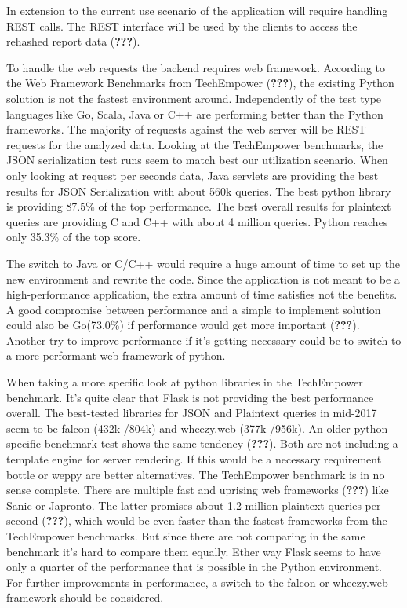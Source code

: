 \documentclass[american,a4paper,oneside,,tablecaptionabove]{scrbook}
\begin{document}
In extension to the current use scenario of the application will require
handling REST calls. The REST interface will be used by the clients to
access the rehashed report data ({\textbf{???}}).

To handle the web requests the backend requires web framework. According
to the Web Framework Benchmarks from TechEmpower ({\textbf{???}}), the
existing Python solution is not the fastest environment around.
Independently of the test type languages like Go, Scala, Java or C++ are
performing better than the Python frameworks. The majority of requests
against the web server will be REST requests for the analyzed data.
Looking at the TechEmpower benchmarks, the JSON serialization test runs
seem to match best our utilization scenario. When only looking at
request per seconds data, Java servlets are providing the best results
for JSON Serialization with about 560k queries. The best python library
is providing 87.5\% of the top performance. The best overall results for
plaintext queries are providing C and C++ with about 4 million queries.
Python reaches only 35.3\% of the top score.

The switch to Java or C/C++ would require a huge amount of time to set
up the new environment and rewrite the code. Since the application is
not meant to be a high-performance application, the extra amount of time
satisfies not the benefits. A good compromise between performance and a
simple to implement solution could also be Go(73.0\%) if performance
would get more important ({\textbf{???}}). Another try to improve
performance if it's getting necessary could be to switch to a more
performant web framework of python.

When taking a more specific look at python libraries in the TechEmpower
benchmark. It's quite clear that Flask is not providing the best
performance overall. The best-tested libraries for JSON and Plaintext
queries in mid-2017 seem to be falcon (432k /804k) and wheezy.web (377k
/956k). An older python specific benchmark test shows the same tendency
({\textbf{???}}). Both are not including a template engine for server
rendering. If this would be a necessary requirement bottle or weppy are
better alternatives. The TechEmpower benchmark is in no sense complete.
There are multiple fast and uprising web frameworks ({\textbf{???}})
like Sanic or Japronto. The latter promises about 1.2 million plaintext
queries per second ({\textbf{???}}), which would be even faster than the
fastest frameworks from the TechEmpower benchmarks. But since there are
not comparing in the same benchmark it's hard to compare them equally.
Ether way Flask seems to have only a quarter of the performance that is
possible in the Python environment. For further improvements in
performance, a switch to the falcon or wheezy.web framework should be
considered.
\end{document}
